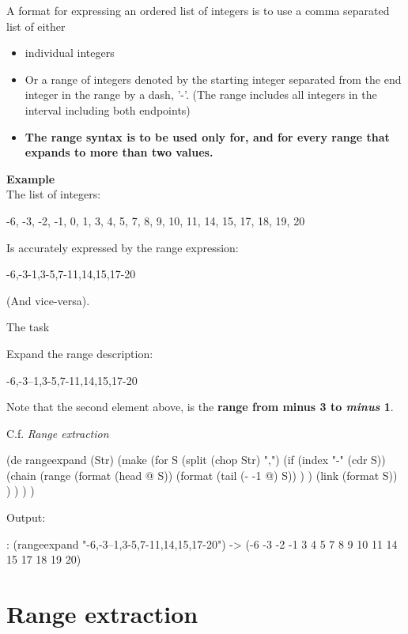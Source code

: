 A format for expressing an ordered list of integers is to use a comma
separated list of either

\begin{itemize}
\item
  individual integers
\item
  Or a range of integers denoted by the starting integer separated from
  the end integer in the range by a dash, '-'. (The range includes all
  integers in the interval including both endpoints)
\end{itemize}

\begin{itemize}
\item
  \textbf{The range syntax is to be used only for, and for every range
  that expands to more than two values.}
\end{itemize}

\textbf{Example}\\ The list of integers:

-6, -3, -2, -1, 0, 1, 3, 4, 5, 7, 8, 9, 10, 11, 14, 15, 17, 18, 19, 20

Is accurately expressed by the range expression:

-6,-3-1,3-5,7-11,14,15,17-20

(And vice-versa).

The task

Expand the range description:

-6,-3--1,3-5,7-11,14,15,17-20

Note that the second element above, is the \textbf{range from minus 3 to
\emph{minus} 1}.

C.f. \emph{Range extraction}

\begin{wideverbatim}

(de rangeexpand (Str)
   (make
      (for S (split (chop Str) ",")
         (if (index "-" (cdr S))
            (chain
               (range
                  (format (head @ S))
                  (format (tail (- -1 @) S)) ) )
            (link (format S)) ) ) ) )

Output:

: (rangeexpand "-6,-3--1,3-5,7-11,14,15,17-20")
-> (-6 -3 -2 -1 3 4 5 7 8 9 10 11 14 15 17 18 19 20)

\end{wideverbatim}

\pagebreak{}
\section*{Range extraction}

